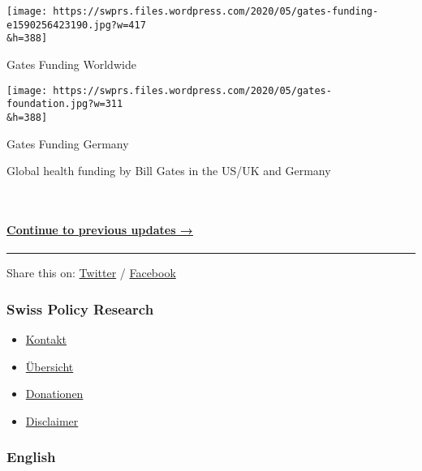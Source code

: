 \href{https://swprs.files.wordpress.com/2020/05/gates-funding-e1590256423190.jpg}{}

\texttt{[image: https://swprs.files.wordpress.com/2020/05/gates-funding-e1590256423190.jpg?w=417\\\&h=388]}

Gates Funding Worldwide

\href{https://swprs.files.wordpress.com/2020/05/gates-foundation.jpg}{}

\texttt{[image: https://swprs.files.wordpress.com/2020/05/gates-foundation.jpg?w=311\\\&h=388]}

Gates Funding Germany

Global health funding by Bill Gates in the US/UK and Germany

~

\hypertarget{continue-to-previous-updates-}{%
\paragraph{\texorpdfstring{\href{https://swprs.org/facts-about-covid19-march-2020-archive/}{Continue
to previous updates
→}}{Continue to previous updates →}}\label{continue-to-previous-updates-}}

\begin{center}\rule{0.5\linewidth}{\linethickness}\end{center}

Share this on:
\href{https://twitter.com/intent/tweet?url=https://swprs.org/a-swiss-doctor-on-covid-19/}{Twitter}
/
\href{https://www.facebook.com/share.php?u=https://swprs.org/a-swiss-doctor-on-covid-19/}{Facebook}

\hypertarget{swiss-policy-research}{%
\subsubsection{Swiss Policy Research}\label{swiss-policy-research}}

\begin{itemize}
\tightlist
\item
  \href{https://swprs.org/kontakt/}{Kontakt}
\item
  \href{https://swprs.org/uebersicht/}{Übersicht}
\item
  \href{https://swprs.org/donationen/}{Donationen}
\item
  \href{https://swprs.org/disclaimer/}{Disclaimer}
\end{itemize}

\hypertarget{english}{%
\subsubsection{English}\label{english}}

